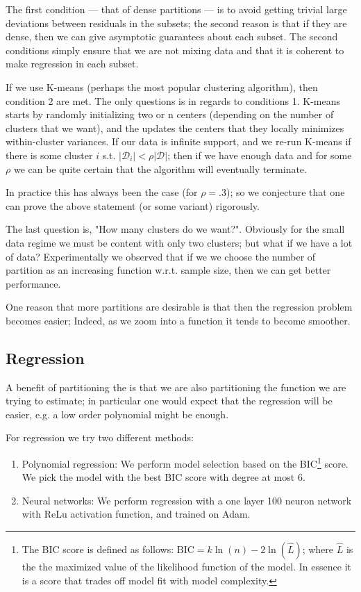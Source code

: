 The first condition ---  that of dense partitions ---  is to avoid getting trivial large deviations between residuals 
in the subsets; the second reason is that if they are dense, then we can give asymptotic guarantees about each subset.
The second conditions simply ensure that we are not mixing data and that it is coherent to make regression
in each subset. 

If we use K-means (perhaps the most popular clustering algorithm), then condition 2 are met. The only 
questions is in regards to conditions 1. K-means starts by randomly initializing two or n centers (depending 
on the number of clusters that we want), and the updates the centers that they locally 
minimizes within-cluster variances. If our data is infinite support, and we re-run K-means if there is some cluster
$i$ s.t. $|\mathcal{D}_i| < \rho |\mathcal{D}|$; then if we have enough data and for some $\rho$ we can be quite 
certain that the algorithm will eventually terminate. 

In practice this has always been the case (for $\rho = .3$); so we conjecture that one can prove the above statement 
(or some variant) rigorously. 

The last question is, "How many clusters do we want?". Obviously for the small data regime we must be content 
with only two clusters; but what if we have a lot of data? Experimentally we observed that if we 
we choose the number of partition as an increasing function w.r.t. sample size, then we can get better performance.

One reason that more partitions are desirable is that then the regression problem becomes easier; Indeed, as we 
zoom into a function it tends to become smoother.


\subsection{Regression}

A benefit of partitioning the is that we are also partitioning the function we are trying to estimate; in 
particular one would expect that the regression will be easier, e.g. a low order polynomial might be enough.

For regression we try two different methods:

\begin{enumerate}
    \item Polynomial regression: We perform model selection based on the BIC\footnote{
    The BIC score is defined as follows: $\mathrm{BIC} =k\ln(n)-2\ln({\widehat{L}})$; where $\widehat{L}$
    is the the maximized value of the likelihood function of the model. In essence it is a score that 
    trades off model fit with model complexity. } score. We pick the model with the 
    best BIC score with degree at most 6. 
    \item Neural networks: We perform regression with a one layer 100 neuron network with ReLu activation
    function, and trained on Adam.
\end{enumerate}

